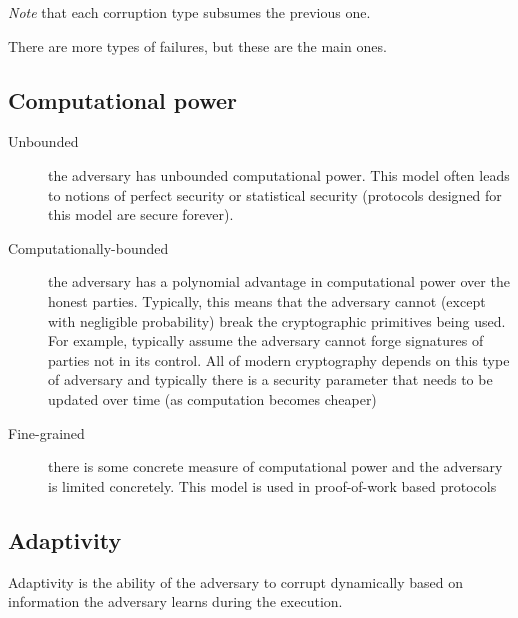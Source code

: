 \emph{Note} that each corruption type subsumes the previous one.


There are more types of failures, but these are the main ones.

\subsection{Computational power}

\begin{description}
    \item[Unbounded] the adversary has unbounded computational power. 
    This model often leads to notions of perfect security or statistical security
    (protocols designed for this model are secure forever).

    \item[Computationally-bounded] the adversary has a polynomial advantage in computational power 
    over the honest parties. 
    Typically, this means that the adversary cannot (except with negligible probability) break the 
    cryptographic primitives being used. 
    For example, typically assume the adversary cannot forge signatures of parties not in its 
    control. All of modern cryptography depends on this type of adversary and typically 
    there is a security parameter that needs to be updated over time (as computation becomes cheaper)
    \item[Fine-grained] there is some concrete measure of computational power and the adversary is 
    limited concretely. This model is used in proof-of-work based protocols
\end{description}


\subsection{Adaptivity}

Adaptivity is the ability of the adversary to corrupt dynamically based on 
information the adversary learns during the execution. 

